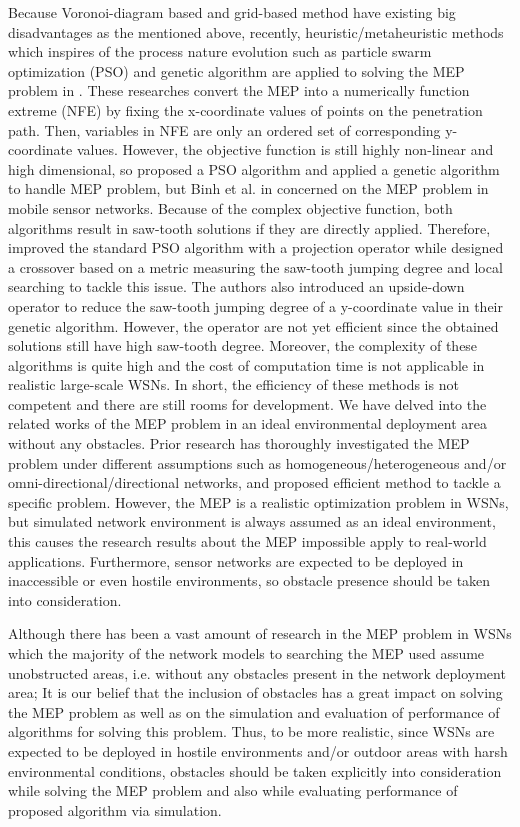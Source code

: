 \documentclass[final]{elsarticle}
\begin{document}
Because Voronoi-diagram based and grid-based method have existing big disadvantages as the mentioned above, recently, heuristic/metaheuristic methods which inspires of the process nature evolution such as particle swarm optimization (PSO) and genetic algorithm are applied to solving the MEP problem in \cite{b11,b12,b25,binh2019efficient}. These researches convert the MEP into a numerically function extreme (NFE) \cite{b8} by fixing the x-coordinate values of points on the penetration path. Then, variables in NFE are only an ordered set of corresponding y-coordinate values. However, the objective function is still highly non-linear and high dimensional, so \cite{b11} proposed a PSO algorithm and \cite {b12,b25,binh2019efficient} applied a genetic algorithm to handle MEP problem, but Binh et al. in \cite{b25} concerned on the MEP problem in mobile sensor networks. Because of the complex objective function, both algorithms result in saw-tooth solutions if they are directly applied. Therefore, \cite{b11} improved the standard PSO algorithm with a projection operator while \cite{binh2019efficient} designed a crossover based on a metric measuring the saw-tooth jumping degree and local searching to tackle this issue. The authors \cite{b12} also introduced an upside-down operator to reduce the saw-tooth jumping degree of a y-coordinate value in their genetic algorithm. However, the operator are not yet efficient since the obtained solutions still have high saw-tooth degree. Moreover, the complexity of these algorithms is quite high and the cost of computation time is not applicable in realistic large-scale WSNs. In short, the efficiency of these methods is not competent and there are still rooms for development.
We have delved into the related works of the MEP problem in an ideal environmental deployment area without any obstacles. Prior research has thoroughly investigated the MEP problem under different assumptions such as homogeneous/heterogeneous and/or omni-directional/directional networks, and proposed efficient method to tackle a specific problem. However, the MEP is a realistic optimization problem in WSNs, but simulated network environment is always assumed as an ideal environment, this causes the research results about the MEP impossible apply to real-world applications. Furthermore, sensor networks are expected to be deployed in inaccessible or even hostile environments, so obstacle presence should be taken into consideration.

Although there has been a vast amount of research in
the MEP problem in WSNs which the majority of the
network models to searching the MEP used assume unobstructed areas, i.e. without any obstacles present in the network deployment area;
It is our belief that the inclusion of obstacles has a great impact on solving the MEP problem as well as on the simulation and evaluation of performance of algorithms for solving this problem. Thus, to be more realistic, since WSNs are expected to be deployed in hostile environments and/or outdoor areas with harsh environmental conditions, obstacles should be taken explicitly into consideration while solving the MEP problem and
also while evaluating performance of proposed algorithm via simulation. 
\end{document}
